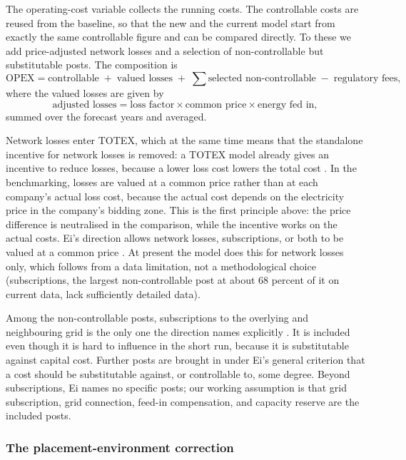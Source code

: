 The operating-cost variable collects the running costs. The controllable costs are reused from
the baseline, so that the new and the current model start from exactly the same controllable
figure and can be compared directly. To these we add price-adjusted network losses and a selection of
non-controllable but substitutable posts. The composition is
\[
  \mathrm{OPEX} = \text{controllable} \;+\; \text{valued losses}
  \;+\; \sum \text{selected non-controllable} \;-\; \text{regulatory fees},
\]
where the valued losses are given by
\[
  \text{adjusted losses} = \text{loss factor} \times \text{common price} \times
  \text{energy fed in},
\]
summed over the forecast years and averaged.

Network losses enter TOTEX, which at the same time means that the standalone incentive for network
losses is removed: a TOTEX model already gives an incentive to reduce losses, because a lower loss
cost lowers the total cost \citep{Ei2025Tillampning}. In the benchmarking, losses are valued at a
common price rather than at each company's actual loss cost, because the actual cost depends on the
electricity price in the company's bidding zone. This is the first principle above: the price
difference is neutralised in the comparison, while the incentive works on the actual costs. Ei's
direction allows network losses, subscriptions, or both to be valued at a common price
\citep[][]{Ei2025Benchmarking}. At present the model does this for network losses only, which
follows from a data limitation, not a methodological choice (subscriptions, the largest
non-controllable post at about 68 percent of it on current data, lack sufficiently detailed data).

Among the non-controllable posts, subscriptions to the overlying and neighbouring grid is the only
one the direction names explicitly \citep[][]{Ei2025Benchmarking}. It is included even though it is
hard to influence in the short run, because it is substitutable against capital cost. Further posts
are brought in under Ei's general criterion that a cost should be substitutable against, or
controllable to, some degree. Beyond subscriptions, Ei names no specific posts; our working
assumption is that grid subscription, grid connection, feed-in compensation, and capacity reserve
are the included posts.

\subsubsection{The placement-environment correction}

